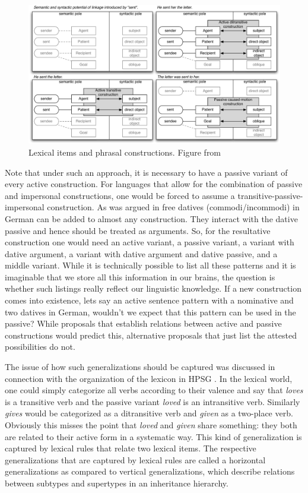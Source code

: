 \begin{figure}
\includegraphics[width=\textwidth]{Figures/2011-van-Trijp.pdf}
\caption{\label{fig-as-trijp}Lexical items and phrasal constructions. Figure %
from }
\end{figure}%

Note that under such an approach, it is necessary to have a passive variant of every active
construction. For languages that allow for the combination of passive and impersonal constructions,
one would be forced to assume a transitive-passive-impersonal construction. As was argued in
 free datives (commodi/incommodi) in German can be added to almost
any construction. They interact with the dative passive and hence should be treated as
arguments. So, for the resultative construction one would need an active variant, a passive variant,
a variant with dative argument, a variant with dative argument and dative passive, and a middle variant.
While it is technically possible to list all these patterns and it is imaginable that we store all
this information in our brains, the question is whether such listings really reflect our linguistic
knowledge. If a new construction comes into existence, lets say an active sentence pattern with a
nominative and two datives in German, wouldn't we expect that this pattern can be used in the
passive? While proposals that establish relations between active and passive constructions would
predict this, alternative proposals that just list the attested possibilities do not.

\addlines[2]
The issue of how such generalizations should be captured was discussed in connection with the
organization of the lexicon in HPSG \citep{Flickinger87,Meurers2001a}. In the lexical world, one could simply categorize all verbs according to their
valence and say that \emph{loves} is a transitive verb and the passive variant \emph{loved} is an
intransitive verb. Similarly \emph{gives} would be categorized as a ditransitive verb and
\emph{given} as a two-place verb. Obviously this misses the point that \emph{loved} and \emph{given}
share something: they both are related to their active form in a systematic way. This kind of
generalization is captured by lexical rules that relate two lexical items. The respective
generalizations that are captured by lexical rules are called a horizontal generalizations as compared to vertical generalizations, which
describe relations between subtypes and supertypes in an inheritance hierarchy.

